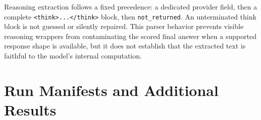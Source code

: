 Reasoning extraction follows a fixed precedence: a dedicated provider field,
then a complete \texttt{<think>...</think>} block, then
\texttt{not\_returned}. An unterminated think block is not guessed or silently
repaired. This parser behavior prevents visible reasoning wrappers from
contaminating the scored final answer when a supported response shape is
available, but it does not establish that the extracted text is faithful to
the model's internal computation.

\section{Run Manifests and Additional Results}
\label{app:run-manifests-results}




